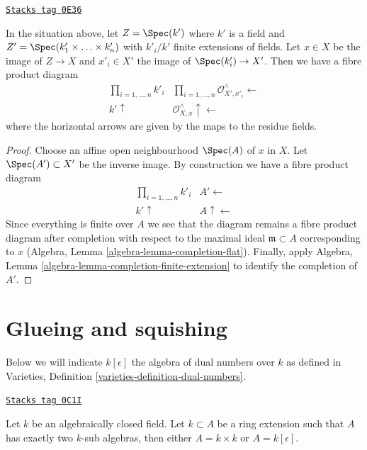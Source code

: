 \begin{lemma}
\label{curves-lemma-complete-local-ring-pushout}
\href{https://stacks.math.columbia.edu/tag/0E36}{\texttt{Stacks tag 0E36}}

In the situation above, let $Z = \Spec(k')$ where $k'$ is a field and
$Z' = \Spec(k'_1 \times \ldots \times k'_n)$ with $k'_i/k'$
finite extensions of fields. Let $x \in X$ be the image of $Z \to X$
and $x'_i \in X'$ the image of $\Spec(k'_i) \to X'$.
Then we have a fibre product diagram
$$
\begin{array}{cc}\prod\nolimits_{i = 1, \ldots, n} k'_i & \prod\nolimits_{i = 1, \ldots, n} \mathcal{O}_{X', x'_i}^\wedge \longleftarrow \\ k' \uparrow & \mathcal{O}_{X, x}^\wedge \uparrow\longleftarrow\end{array}
$$
where the horizontal arrows are given by the maps to the residue fields.
\end{lemma}

\begin{proof}
Choose an affine open neighbourhood $\Spec(A)$ of $x$ in $X$.
Let $\Spec(A') \subset X'$ be the inverse image. By construction
we have a fibre product diagram
$$
\begin{array}{cc}\prod\nolimits_{i = 1, \ldots, n} k'_i & A' \longleftarrow \\ k' \uparrow & A \uparrow\longleftarrow\end{array}
$$
Since everything is finite over $A$ we see that the diagram remains
a fibre product diagram after completion with respect to the
maximal ideal $\mathfrak m \subset A$ corresponding to $x$
(Algebra, Lemma \ref{algebra-lemma-completion-flat}).
Finally, apply Algebra, Lemma
\ref{algebra-lemma-completion-finite-extension}
to identify the completion of $A'$.
\end{proof}

\section{Glueing and squishing}
\label{curves-section-glueing-squishing}
Below we will indicate $k[\epsilon]$ the algebra of dual numbers
over $k$ as defined in
Varieties, Definition \ref{varieties-definition-dual-numbers}.

\begin{lemma}
\label{curves-lemma-no-in-between-over-k}
\href{https://stacks.math.columbia.edu/tag/0C1I}{\texttt{Stacks tag 0C1I}}

Let $k$ be an algebraically closed field. Let $k \subset A$ be a ring
extension such that $A$ has exactly two $k$-sub algebras, then
either $A = k \times k$ or $A = k[\epsilon]$.
\end{lemma}

